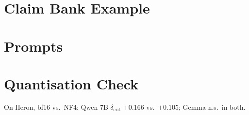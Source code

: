 \section{Claim Bank Example}
\label{app:bank}

\section{Prompts}
\label{app:prompts}

\section{Quantisation Check}
\label{app:quant}
On Heron, bf16 vs.\ NF4: Qwen-7B $\delta_{\text{crit}}$ $+0.166$ vs.\ $+0.105$; Gemma n.s.\ in both.
